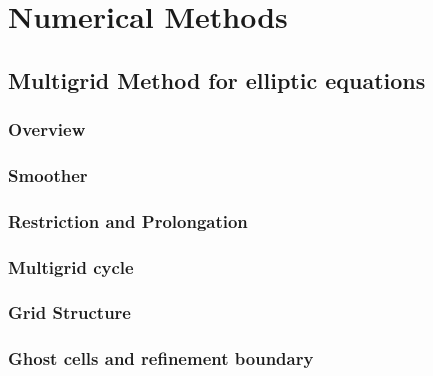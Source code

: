 
\chapter{Numerical Methods}  %

\ifpdf
    \graphicspath{{Chapter3/Figs/PDF/}{Chapter3/Figs/}}
\else
    \graphicspath{{Chapter3/Figs/}}
\fi


\section{Multigrid Method for elliptic equations} %
\label{section3.1}

\subsection{Overview} %
\label{section3.1.1}

\subsection{Smoother} %
\label{section3.1.2}

\subsection{Restriction and Prolongation} %
\label{section3.1.3}

\subsection{Multigrid cycle} %
\label{section3.1.4}

\subsection{Grid Structure} %
\label{section3.1.5}

\subsection{Ghost cells and refinement boundary} %
\label{section3.1.6}


